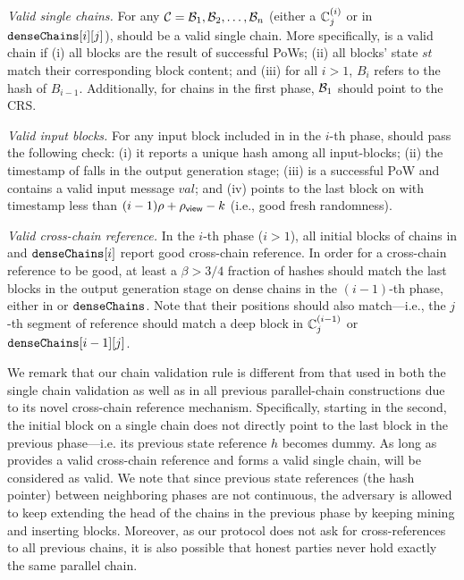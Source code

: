 \begin{cccItemize}[noitemsep]
      \item \emph{Valid single chains.}
      For any $\mathcal{C} = \mathcal{B}_1, \mathcal{B}_2, \ldots, \mathcal{B}_n$ (either a $\mathbb{C}^{(i)}_j$ or in $\mathtt{denseChains}[i][j]$), \chain should be a valid single chain.
      More specifically, \chain is a valid chain if (i) all blocks are the result of successful PoWs; (ii) all blocks' state $st$ match their corresponding block content; and (iii) for all $i > 1$, $B_{i}$ refers to the hash of $B_{i - 1}$.
      Additionally, for chains in the first phase, $\mathcal{B}_1$ should point to the CRS.

      \item \emph{Valid input blocks.}
      For any input block \IB included in \chain in the $i$-th phase, \IB should pass the following check: (i) it reports a unique hash among all input-blocks; (ii) the timestamp of \IB falls in the output generation stage; (iii) \IB is a successful PoW and contains a valid input message $val$; and (iv) \IB points to the last block on \chain with timestamp less than $(i - 1)\rho + \rho_{\textsf{view}} - k$ (i.e., good fresh randomness).

      \item \emph{Valid cross-chain reference.}
      In the $i$-th phase ($i > 1$), all initial blocks of chains in  and $\mathtt{denseChains}[i]$ report good cross-chain reference.
      In order for a cross-chain reference to be good, at least a $\beta > 3 / 4$ fraction of hashes should match the last blocks in the output generation stage on dense chains in the $(i - 1)$-th phase, either in \parallelChains or $\mathtt{denseChains}$.
      Note that their positions should also match---i.e., the $j$-th segment of reference should match a deep block in $\mathbb{C}^{(i - 1)}_j$ or $\mathtt{denseChains}[i - 1][j]$.
\end{cccItemize}

We remark that our chain validation rule is different from that used in both the single chain validation as well as in all previous parallel-chain constructions due to its novel cross-chain reference mechanism.
%
Specifically, starting in the second, the initial block on a single chain \chain does not directly point to the last block in the previous phase---i.e. its previous state reference $h$ becomes dummy.
%
As long as \chain provides a valid cross-chain reference and forms a valid single chain, \chain will be considered as valid.
%
We note that since previous state references (the hash pointer) between neighboring phases are not continuous, the adversary is allowed to keep extending the head of the chains in the previous phase by keeping mining and inserting blocks.
%
Moreover, as our protocol does not ask for cross-references to all previous chains, it is also possible that honest parties never hold exactly the same parallel chain.

